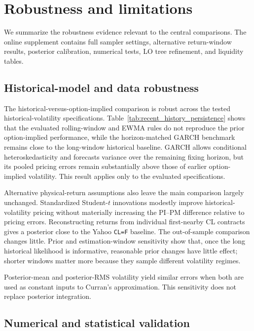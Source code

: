 \section{Robustness and limitations}\label{sec:robustness}

We summarize the robustness evidence relevant to the central comparisons. The online supplement contains full sampler settings, alternative return-window results, posterior calibration, numerical tests, LO tree refinement, and liquidity tables.

\subsection{Historical-model and data robustness}

The historical-versus-option-implied comparison is robust across the tested historical-volatility specifications. Table~\ref{tab:recent_history_persistence} shows that the evaluated rolling-window and EWMA rules do not reproduce the prior option-implied performance, while the horizon-matched GARCH benchmark remains close to the long-window historical baseline. GARCH allows conditional heteroskedasticity and forecasts variance over the remaining fixing horizon, but its pooled pricing errors remain substantially above those of earlier option-implied volatility. This result applies only to the evaluated specifications.

Alternative physical-return assumptions also leave the main comparison largely unchanged. Standardized Student-\(t\) innovations modestly improve historical-volatility pricing without materially increasing the PI--PM difference relative to pricing errors. Reconstructing returns from individual first-nearby CL contracts gives a posterior close to the Yahoo \texttt{CL=F} baseline. The out-of-sample comparison changes little. Prior and estimation-window sensitivity show that, once the long historical likelihood is informative, reasonable prior changes have little effect; shorter windows matter more because they sample different volatility regimes.

Posterior-mean and posterior-RMS volatility yield similar errors when both are used as constant inputs to Curran's approximation. This sensitivity does not replace posterior integration.

\subsection{Numerical and statistical validation}\label{sec:numerical_robustness}


